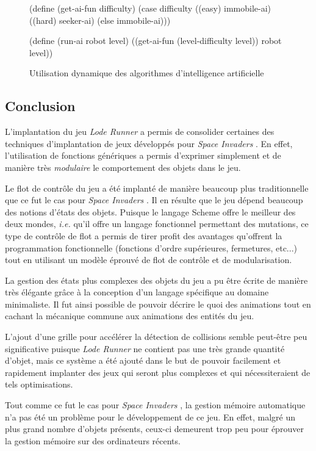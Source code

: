\documentclass[12pt,oneside,letterpaper,francais]{book}
\newcommand{\ie}{{\textit{i.e. }}}
\newcommand{\lr}{{\textit{Lode Runner }}}
\newcommand{\si}{{\textit{Space Invaders }}}
\begin{document}
\begin{figure}[htb!]
  \begin{schemecode}
(define (get-ai-fun difficulty)
  (case difficulty
    ((easy) immobile-ai)
    ((hard) seeker-ai)
    (else immobile-ai)))

(define (run-ai robot level)
  ((get-ai-fun (level-difficulty level)) robot level))
  \end{schemecode}
  \caption{Utilisation dynamique des algorithmes d'intelligence
    artificielle}
  \label{Exp:dyn-ai}
\end{figure}


\subsection{Conclusion}

L'implantation du jeu \lr a permis de consolider certaines des
techniques d'implantation de jeux développés pour \si. En effet,
l'utilisation de fonctions génériques a permis d'exprimer simplement
et de manière très \emph{modulaire} le comportement des objets dans le
jeu.

Le flot de contrôle du jeu a été implanté de manière beaucoup plus
traditionnelle que ce fut le cas pour \si. Il en résulte que le jeu
dépend beaucoup des notions d'états des objets. Puisque le langage
Scheme offre le meilleur des deux mondes, \ie qu'il offre un langage
fonctionnel permettant des mutations, ce type de contrôle de flot a
permis de tirer profit des avantages qu'offrent la programmation
fonctionnelle (fonctions d'ordre supérieures, fermetures, etc...) tout
en utilisant un modèle éprouvé de flot de contrôle et de
modularisation.

La gestion des états plus complexes des objets du jeu a pu être écrite
de manière très élégante grâce à la conception d'un langage spécifique
au domaine minimaliste. Il fut ainsi possible de pouvoir décrire le
\og quoi \fg des animations tout en cachant la mécanique commune aux
animations des entités du jeu.

L'ajout d'une grille pour accélérer la détection de collisions semble
peut-être peu significative puisque \lr ne contient pas une très
grande quantité d'objet, mais ce système a été ajouté dans le but de
pouvoir facilement et rapidement implanter des jeux qui seront plus
complexes et qui nécessiteraient de tels optimisations.

Tout comme ce fut le cas pour \si, la gestion mémoire automatique n'a
pas été un problème pour le développement de ce jeu. En effet, malgré
un plus grand nombre d'objets présents, ceux-ci demeurent trop peu
pour éprouver la gestion mémoire sur des ordinateurs récents.
\end{document}
